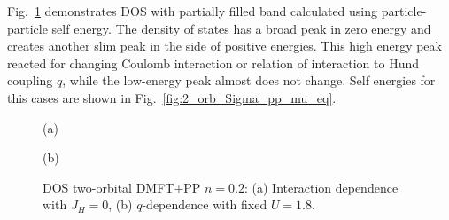 Fig.~\ref{fig:2_orb_DOS_pp_mu_eq} demonstrates DOS with partially filled band calculated using particle-particle self energy. The density of states has a broad peak in zero energy and creates another slim peak in the side of positive energies. This high energy peak reacted for changing Coulomb interaction or relation of interaction to Hund coupling $q$, while the low-energy peak almost does not change. Self energies for this cases are shown in Fig.~\ref{fig:2_orb_Sigma_pp_mu_eq}.
\begin{figure}[h!]
\begin{minipage}[h]{0.5\linewidth}
 (a) \\
\end{minipage}
\hfill
\begin{minipage}[h]{0.5\linewidth}
 (b) \\
\end{minipage}
\caption{DOS two-orbital DMFT+PP $n=0.2$: (a) Interaction dependence with $J_{H}=0$, (b) $q$-dependence with fixed $U=1.8$.}
\label{fig:2_orb_DOS_pp_mu_eq}
\end{figure}


